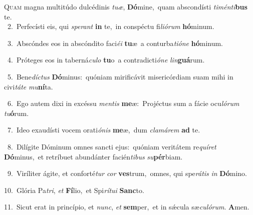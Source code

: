 \lettrine{\initial\textcolor{\initialcolor}{Q}}{uam} magna multitúdo dulcédinis \textit{tu}\-\textit{æ}, \textbf{Dó}\-mine,~\star quam abscondísti \textit{ti}\-\textit{mén}\textit{ti}\textbf{bus} te.\\
{\numbfont\textcolor{\numbcolor}{~2.}}~Perfecísti eis, qui \textit{spe}\-\textit{rant} \textbf{in} te,~\star in conspéctu fi\-\textit{li}\-\textit{ó}\textit{rum} \textbf{hó}\-minum.\par
{\numbfont\textcolor{\numbcolor}{~3.}}~Abscóndes eos in abscóndito faci\-\textit{é}\-\textit{i} \textbf{tu}\-æ~\star a conturba\-\textit{ti}\-\textit{ó}\textit{ne} \textbf{hó}\-minum.\par
{\numbfont\textcolor{\numbcolor}{~4.}}~Próteges eos in taberná\-\textit{cu}\-\textit{lo} \textbf{tu}\-o~\star a contradicti\-\textit{ó}\-\textit{ne} \textit{lin}\-\textbf{guá}rum.\par
{\numbfont\textcolor{\numbcolor}{~5.}}~Bene\-\textit{díc}\-\textit{tus} \textbf{Dó}\-minus:~\star quóniam mirificávit misericórdiam suam mihi in civi\-\textit{tá}\-\textit{te} \textit{mu}\-\textbf{ní}ta.\par
{\numbfont\textcolor{\numbcolor}{~6.}}~Ego autem dixi in excéssu \textit{men}\-\textit{tis} \textbf{me}\-æ:~\star Projéctus sum a fácie ocu\-\textit{ló}\-\textit{rum} \textit{tu}\-\textbf{ó}rum.\par
{\numbfont\textcolor{\numbcolor}{~7.}}~Ideo exaudísti vocem orati\-\textit{ó}\-\textit{nis} \textbf{me}\-æ,~\star dum \textit{cla}\-\textit{má}\textit{rem} \textbf{ad} te.\par
{\numbfont\textcolor{\numbcolor}{~8.}}~Dilígite Dóminum omnes sancti ejus:~\dagger quóniam veritátem re\-\textit{quí}\-\textit{ret} \textbf{Dó}\-minus,~\star et retríbuet abundánter facién\-\textit{ti}\-\textit{bus} \textit{su}\-\textbf{pér}biam.\par
{\numbfont\textcolor{\numbcolor}{~9.}}~Viríliter ágite, et conforté\textit{tur} \textit{cor} \textbf{ves}\-trum,~\star omnes, qui spe\-\textit{rá}\-\textit{tis} \textit{in} \textbf{Dó}\-mino.\par
{\numbfont\textcolor{\numbcolor}{10.}}~Glória Pa\-\textit{tri}\-, \textit{et} \textbf{Fí}\-lio,~\star et Spi\-\textit{rí}\-\textit{tu}\textit{i} \textbf{Sanc}\-to.\par
{\numbfont\textcolor{\numbcolor}{11.}}~Sicut erat in princípio, et \textit{nunc}\-, \textit{et} \textbf{sem}\-per,~\star et in sǽcula sæ\-\textit{cu}\-\textit{ló}\textit{rum}. \textbf{A}\-men.\par
